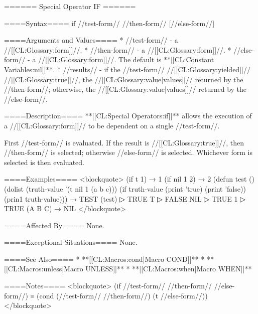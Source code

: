====== Special Operator IF ======

====Syntax====
\DefspecWithValues if {//test-form// //then-form// [//else-form//]} {}

====Arguments and Values====
  * //test-form// - a //[[CL:Glossary:form]]//.
  * //then-form// - a //[[CL:Glossary:form]]//.
  * //else-form// - a //[[CL:Glossary:form]]//. The default is **[[CL:Constant Variables:nil]]**.
  * //results// - if the //test-form// //[[CL:Glossary:yielded]]// //[[CL:Glossary:true]]//, the //[[CL:Glossary:value|values]]// returned by the //then-form//; otherwise, the //[[CL:Glossary:value|values]]// returned by the //else-form//.

====Description====
**[[CL:Special Operators:if]]** allows the execution of a //[[CL:Glossary:form]]// to be dependent on a single //test-form//.

First //test-form// is evaluated. If the result is //[[CL:Glossary:true]]//, then //then-form// is selected; otherwise //else-form// is selected. Whichever form is selected is then evaluated.

====Examples====
<blockquote> (if t 1) → 1 (if nil 1 2) → 2 (defun test () (dolist (truth-value '(t nil 1 (a b c))) (if truth-value (print 'true) (print 'false)) (prin1 truth-value))) → TEST (test)
▷ TRUE T
▷ FALSE NIL
▷ TRUE 1
▷ TRUE (A B C) → NIL </blockquote>

====Affected By====
None.

====Exceptional Situations====
None.

====See Also====
  * **[[CL:Macros:cond|Macro COND]]**
  * **[[CL:Macros:unless|Macro UNLESS]]**
  * **[[CL:Macros:when|Macro WHEN]]**

====Notes====
<blockquote> (if //test-form// //then-form// //else-form//) ≡ (cond (//test-form// //then-form//) (t //else-form//)) </blockquote>

